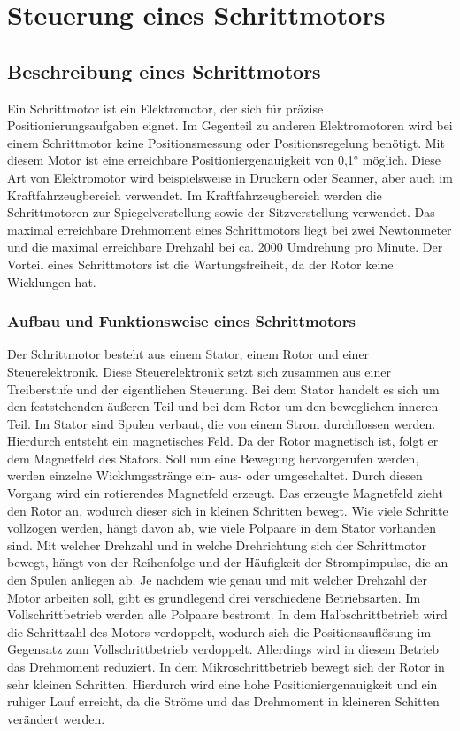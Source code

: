 

\chapter{Steuerung eines Schrittmotors}
\section{Beschreibung eines Schrittmotors}
Ein Schrittmotor ist ein Elektromotor, der sich für präzise Positionierungsaufgaben eignet. Im Gegenteil zu anderen Elektromotoren wird bei einem Schrittmotor keine Positionsmessung oder Positionsregelung benötigt. Mit diesem Motor ist eine erreichbare Positioniergenauigkeit von 0,1° möglich. Diese Art von Elektromotor wird beispielsweise in Druckern oder Scanner, aber auch im Kraftfahrzeugbereich verwendet. Im Kraftfahrzeugbereich werden die Schrittmotoren zur Spiegelverstellung sowie der Sitzverstellung verwendet. Das maximal erreichbare Drehmoment eines Schrittmotors liegt bei zwei Newtonmeter und die maximal erreichbare Drehzahl bei ca. 2000 Umdrehung pro Minute. Der Vorteil eines Schrittmotors ist die Wartungsfreiheit, da der Rotor keine Wicklungen hat. \cite{Babiel.2023}\cite{Hagl.2021}
\subsection{Aufbau und Funktionsweise eines Schrittmotors}
Der Schrittmotor besteht aus einem Stator, einem Rotor und einer Steuerelektronik. Diese Steuerelektronik setzt sich zusammen aus einer Treiberstufe und der eigentlichen Steuerung. Bei dem Stator handelt es sich um den feststehenden äußeren Teil und bei dem Rotor um den beweglichen inneren Teil. Im Stator sind Spulen verbaut, die von einem Strom durchflossen werden. Hierdurch entsteht ein magnetisches Feld. Da der Rotor magnetisch ist, folgt er dem Magnetfeld des Stators. Soll nun eine Bewegung hervorgerufen werden, werden einzelne Wicklungsstränge ein- aus- oder umgeschaltet. Durch diesen Vorgang wird ein rotierendes Magnetfeld erzeugt. Das erzeugte Magnetfeld zieht den Rotor an, wodurch dieser sich in kleinen Schritten bewegt. Wie viele Schritte vollzogen werden, hängt davon ab, wie viele Polpaare in dem Stator vorhanden sind. Mit welcher Drehzahl und in welche Drehrichtung sich der Schrittmotor bewegt, hängt von der Reihenfolge und der Häufigkeit der Strompimpulse, die an den Spulen anliegen ab. Je nachdem wie genau und mit welcher Drehzahl der Motor arbeiten soll, gibt es grundlegend drei verschiedene Betriebsarten. Im Vollschrittbetrieb werden alle Polpaare bestromt. In dem Halbschrittbetrieb wird die Schrittzahl des Motors verdoppelt, wodurch sich die Positionsauflösung im Gegensatz zum Vollschrittbetrieb verdoppelt. Allerdings wird in diesem Betrieb das Drehmoment reduziert. In dem Mikroschrittbetrieb bewegt sich der Rotor in sehr kleinen Schritten. Hierdurch wird eine hohe Positioniergenauigkeit und ein ruhiger Lauf erreicht, da die Ströme und das Drehmoment in kleineren Schitten verändert werden. \cite{Hagl.2021}\cite{Bernstein.2018} 
